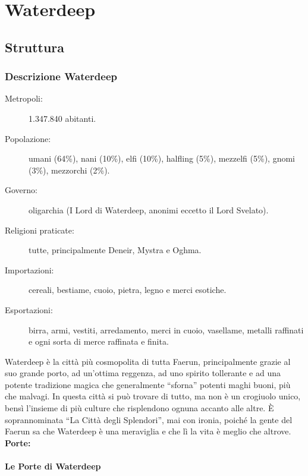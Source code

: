 \documentclass{article}
\begin{document}
\section{Waterdeep}
          \subsection{Struttura}
              \subsubsection{Descrizione Waterdeep} 
              \begin{description}
                \item[Metropoli:] 1.347.840 abitanti.
                \item[Popolazione:] umani (64\%), nani (10\%), elfi (10\%), halfling (5\%), mezzelfi (5\%), gnomi (3\%), mezzorchi (2\%).
                \item[Governo:] oligarchia (I Lord di Waterdeep, anonimi eccetto il Lord Svelato).
                \item[Religioni praticate:] tutte, principalmente Deneir, Mystra e Oghma.
                \item[Importazioni:] cereali, bestiame, cuoio, pietra, legno e merci esotiche.
                \item[Esportazioni:] birra, armi, vestiti, arredamento, merci in cuoio, vasellame, metalli raffinati e ogni sorta di merce raffinata e finita.
            \end{description}
            
            Waterdeep è la città più cosmopolita di tutta Faerun, principalmente grazie al suo grande porto, ad un’ottima reggenza, ad uno spirito tollerante e ad una potente tradizione magica che generalmente “sforna” potenti maghi buoni, più che malvagi. In questa città si può trovare di tutto, ma non è un crogiuolo unico, bensì l’insieme di più culture che risplendono ognuna accanto alle altre. È soprannominata “La Città degli Splendori”, mai con ironia, poiché la gente del Faerun sa che Waterdeep è una meraviglia e che lì la vita è meglio che altrove.
                  \textbf{Porte:}
                                              
                            \paragraph{Le Porte di Waterdeep}
\end{document}
